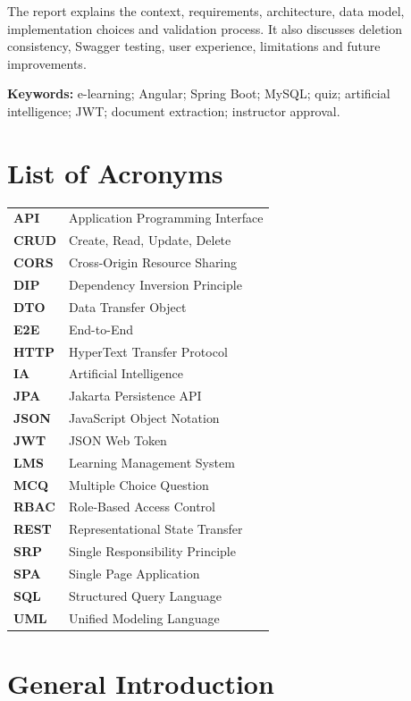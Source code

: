 ﻿\documentclass[12pt,a4paper,openright]{report}
\begin{document}
The report explains the context, requirements, architecture, data model,
implementation choices and validation process. It also discusses deletion
consistency, Swagger testing, user experience, limitations and future
improvements.

\noindent\textbf{Keywords:} e-learning; Angular; Spring Boot; MySQL; quiz;
artificial intelligence; JWT; document extraction; instructor approval.

\tableofcontents
\listoffigures
\listoftables
\chapter*{List of Acronyms}
\small
\setlength{\LTleft}{0pt}
\setlength{\LTright}{0pt}
\begin{tabularx}{\textwidth}{>{\bfseries}p{}X}
API & Application Programming Interface\\
CRUD & Create, Read, Update, Delete\\
CORS & Cross-Origin Resource Sharing\\
DIP & Dependency Inversion Principle\\
DTO & Data Transfer Object\\
E2E & End-to-End\\
HTTP & HyperText Transfer Protocol\\
IA & Artificial Intelligence\\
JPA & Jakarta Persistence API\\
JSON & JavaScript Object Notation\\
JWT & JSON Web Token\\
LMS & Learning Management System\\
MCQ & Multiple Choice Question\\
RBAC & Role-Based Access Control\\
REST & Representational State Transfer\\
SRP & Single Responsibility Principle\\
SPA & Single Page Application\\
SQL & Structured Query Language\\
UML & Unified Modeling Language
\end{tabularx}
\chapter*{General Introduction}




\end{document}
